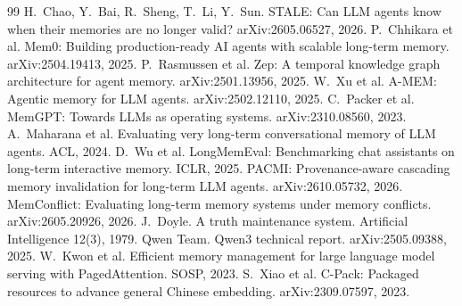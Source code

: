 \documentclass[10pt,twocolumn]{article}
\begin{document}
\begin{thebibliography}{99}\small
{} H.~Chao, Y.~Bai, R.~Sheng, T.~Li, Y.~Sun. STALE: Can LLM agents know when their memories are no longer
valid? arXiv:2605.06527, 2026.
 P.~Chhikara et al. Mem0: Building production-ready AI agents with scalable long-term memory.
arXiv:2504.19413, 2025.
 P.~Rasmussen et al. Zep: A temporal knowledge graph architecture for agent memory. arXiv:2501.13956, 2025.
 W.~Xu et al. A-MEM: Agentic memory for LLM agents. arXiv:2502.12110, 2025.
 C.~Packer et al. MemGPT: Towards LLMs as operating systems. arXiv:2310.08560, 2023.
 A.~Maharana et al. Evaluating very long-term conversational memory of LLM agents. ACL, 2024.
 D.~Wu et al. LongMemEval: Benchmarking chat assistants on long-term interactive memory. ICLR, 2025.
 PACMI: Provenance-aware cascading memory invalidation for long-term LLM agents. arXiv:2610.05732, 2026.
 MemConflict: Evaluating long-term memory systems under memory conflicts. arXiv:2605.20926, 2026.
 J.~Doyle. A truth maintenance system. Artificial Intelligence 12(3), 1979.
 Qwen Team. Qwen3 technical report. arXiv:2505.09388, 2025.
 W.~Kwon et al. Efficient memory management for large language model serving with PagedAttention. SOSP, 2023.
 S.~Xiao et al. C-Pack: Packaged resources to advance general Chinese embedding. arXiv:2309.07597, 2023.
\end{thebibliography}
\end{document}
